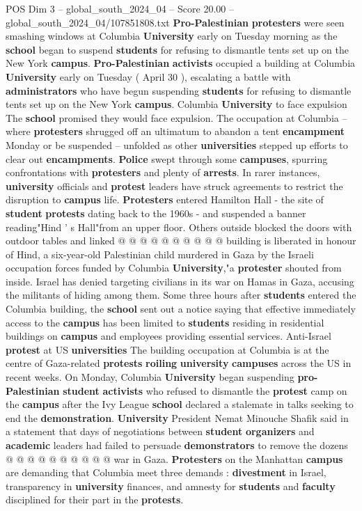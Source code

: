 \begin{textsample}{POS Dim 3 – global\_south\_2024\_04 – Score 20.00 – global\_south\_2024\_04/107851808.txt}  \label{ex:f3_pos_213}
\textbf{Pro-Palestinian} \textbf{protesters} were seen smashing windows at Columbia \textbf{University} early on Tuesday morning as the \textbf{school} began to suspend \textbf{students} for refusing to dismantle tents set up on the New York \textbf{campus}. \textbf{Pro-Palestinian} \textbf{activists} occupied a building at Columbia \textbf{University} early on Tuesday ( April 30 ), escalating a battle with \textbf{administrators} who have begun suspending \textbf{students} for refusing to dismantle tents set up on the New York \textbf{campus}.
Columbia \textbf{University} to face expulsion The \textbf{school} promised they would face expulsion.
The occupation at Columbia -- where \textbf{protesters} shrugged off an ultimatum to abandon a tent \textbf{encampment} Monday or be suspended -- unfolded as other \textbf{universities} stepped up efforts to clear out \textbf{encampments}. \textbf{Police} swept through some \textbf{campuses}, spurring confrontations with \textbf{protesters} and plenty of \textbf{arrests}.
In rarer instances, \textbf{university} officials and \textbf{protest} leaders have struck agreements to restrict the disruption to \textbf{campus} life. \textbf{Protesters} entered Hamilton Hall - the site of \textbf{student} \textbf{protests} dating back to the 1960s - and suspended a banner reading"Hind ' s Hall"from an upper floor.
Others outside blocked the doors with outdoor tables and linked @ @ @ @ @ @ @ @ @ @ building is liberated in honour of Hind, a six-year-old Palestinian child murdered in Gaza by the Israeli occupation forces funded by Columbia \textbf{University},"a \textbf{protester} shouted from inside.
Israel has denied targeting civilians in its war on Hamas in Gaza, accusing the militants of hiding among them.
Some three hours after \textbf{students} entered the Columbia building, the \textbf{school} sent out a notice saying that effective immediately access to the \textbf{campus} has been limited to \textbf{students} residing in residential buildings on \textbf{campus} and employees providing essential services.
Anti-Israel \textbf{protest} at US \textbf{universities} The building occupation at Columbia is at the centre of Gaza-related \textbf{protests} \textbf{roiling} \textbf{university} \textbf{campuses} across the US in recent weeks.
On Monday, Columbia \textbf{University} began suspending \textbf{pro-Palestinian} \textbf{student} \textbf{activists} who refused to dismantle the \textbf{protest} camp on the \textbf{campus} after the Ivy League \textbf{school} declared a stalemate in talks seeking to end the \textbf{demonstration}. \textbf{University} President Nemat Minouche Shafik said in a statement that days of negotiations between \textbf{student} \textbf{organizers} and \textbf{academic} leaders had failed to persuade \textbf{demonstrators} to remove the dozens @ @ @ @ @ @ @ @ @ @ war in Gaza. \textbf{Protesters} on the Manhattan \textbf{campus} are demanding that Columbia meet three demands : \textbf{divestment} in Israel, transparency in \textbf{university} finances, and amnesty for \textbf{students} and \textbf{faculty} disciplined for their part in the \textbf{protests}.

\end{textsample}
